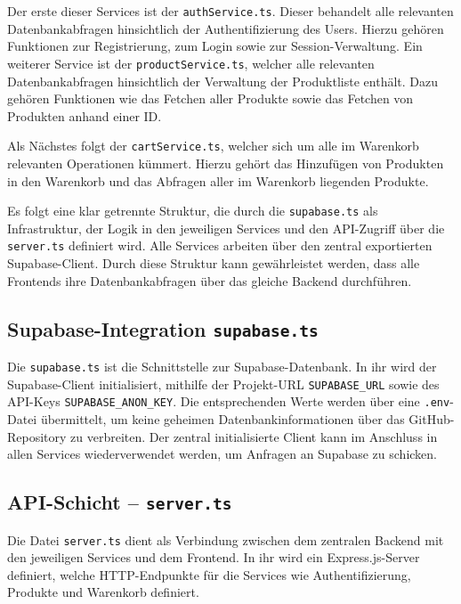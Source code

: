 \documentclass[oneside]{ausarbeitung}
\begin{document}
Der erste dieser Services ist der \texttt{authService.ts}. Dieser behandelt alle relevanten Datenbankabfragen hinsichtlich der Authentifizierung des Users. Hierzu gehören Funktionen zur Registrierung, zum Login sowie zur Session-Verwaltung. Ein weiterer Service ist der \texttt{productService.ts}, welcher alle relevanten Datenbankabfragen hinsichtlich der Verwaltung der Produktliste enthält. Dazu gehören Funktionen wie das Fetchen aller Produkte sowie das Fetchen von Produkten anhand einer ID.

Als Nächstes folgt der \texttt{cartService.ts}, welcher sich um alle im Warenkorb relevanten Operationen kümmert. Hierzu gehört das Hinzufügen von Produkten in den Warenkorb und das Abfragen aller im Warenkorb liegenden Produkte.

Es folgt eine klar getrennte Struktur, die durch die \texttt{supabase.ts} als Infrastruktur, der Logik in den jeweiligen Services und den API-Zugriff über die \texttt{server.ts} definiert wird. Alle Services arbeiten über den zentral exportierten Supabase-Client. Durch diese Struktur kann gewährleistet werden, dass alle Frontends ihre Datenbankabfragen über das gleiche Backend durchführen.

\subsection{Supabase-Integration \texttt{supabase.ts}}

Die \texttt{supabase.ts} ist die Schnittstelle zur Supabase-Datenbank. In ihr wird der Supabase-Client initialisiert, mithilfe der Projekt-URL \texttt{SUPABASE\_URL} sowie des API-Keys \texttt{SUPABASE\_ANON\_KEY}. Die entsprechenden Werte werden über eine \texttt{.env}-Datei übermittelt, um keine geheimen Datenbankinformationen über das GitHub-Repository zu verbreiten. Der zentral initialisierte Client kann im Anschluss in allen Services wiederverwendet werden, um Anfragen an Supabase zu schicken.

\subsection{API-Schicht – \texttt{server.ts}}

Die Datei \texttt{server.ts} dient als Verbindung zwischen dem zentralen Backend mit den jeweiligen Services und dem Frontend. In ihr wird ein Express.js-Server definiert, welche HTTP-Endpunkte für die Services wie Authentifizierung, Produkte und Warenkorb definiert.
\end{document}
